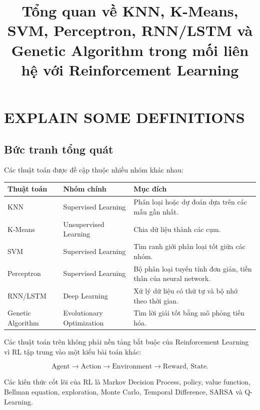 \documentclass[12pt,a4paper]{report}
\title{\textbf{Tổng quan về KNN, K-Means, SVM, Perceptron, RNN/LSTM và Genetic Algorithm trong mối liên hệ với Reinforcement Learning}}
\author{}
\date{}
\begin{document}
\maketitle
\tableofcontents
\newpage

\chapter{EXPLAIN SOME DEFINITIONS}

\section{Bức tranh tổng quát}

Các thuật toán được đề cập thuộc nhiều nhóm khác nhau:

\begin{table}[htbp]
\centering
\small
\begin{tabularx}{\textwidth}{
    >{\raggedright\arraybackslash}p{3.0cm}
    >{\raggedright\arraybackslash}p{4.0cm}
    >{\raggedright\arraybackslash}X
}
\toprule
\textbf{Thuật toán} & \textbf{Nhóm chính} & \textbf{Mục đích} \\
\midrule
KNN & Supervised Learning & Phân loại hoặc dự đoán dựa trên các mẫu gần nhất. \\
K-Means & Unsupervised Learning & Chia dữ liệu thành các cụm. \\
SVM & Supervised Learning & Tìm ranh giới phân loại tốt giữa các nhóm. \\
Perceptron & Supervised Learning & Bộ phân loại tuyến tính đơn giản, tiền thân của neural network. \\
RNN/LSTM & Deep Learning & Xử lý dữ liệu có thứ tự và bộ nhớ theo thời gian. \\
Genetic Algorithm & Evolutionary Optimization & Tìm lời giải tốt bằng mô phỏng tiến hóa. \\
\bottomrule
\end{tabularx}
\end{table}

Các thuật toán trên không phải nền tảng bắt buộc của Reinforcement Learning vì RL tập trung vào một kiểu bài toán khác:

\begin{equation}
\text{Agent}
\rightarrow
\text{Action}
\rightarrow
\text{Environment}
\rightarrow
\text{Reward, State}.
\end{equation}

Các kiến thức cốt lõi của RL là Markov Decision Process, policy, value function, Bellman equation, exploration, Monte Carlo, Temporal Difference, SARSA và Q-Learning.
\end{document}
